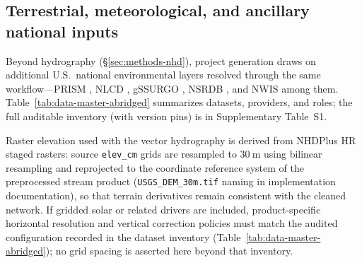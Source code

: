\subsection{Terrestrial, meteorological, and ancillary national inputs}
\label{sec:methods-inputs}

Beyond hydrography (\S\ref{sec:methods-nhd}), project generation draws on additional U.S.\ national environmental layers resolved through the same workflow---PRISM \citep{Daly2008PRISM}, NLCD \citep{Dewitz2021NLCD}, gSSURGO \citep{NRCSgSSURGO}, NSRDB \citep{Sengupta2018NSRDB}, and NWIS \citep{USGSNWIS} among them. Table~\ref{tab:data-master-abridged} summarizes datasets, providers, and roles; the full auditable inventory (with version pins) is in Supplementary Table~S1.

\begin{table}[htbp]
  \centering
  \caption{Abridged national data inventory.}
  \label{tab:data-master-abridged}
  \footnotesize
  \resizebox{\textwidth}{!}{%
  }
\end{table}

Raster elevation used with the vector hydrography is derived from NHDPlus HR staged rasters: source \texttt{elev\_cm} grids are resampled to $30~\mathrm{m}$ using bilinear resampling and reprojected to the coordinate reference system of the preprocessed stream product (\texttt{USGS\_DEM\_30m.tif} naming in implementation documentation), so that terrain derivatives remain consistent with the cleaned network.
If gridded solar or related drivers are included, product-specific horizontal resolution and vertical correction policies must match the audited configuration recorded in the dataset inventory (Table~\ref{tab:data-master-abridged}); no grid spacing is asserted here beyond that inventory.
